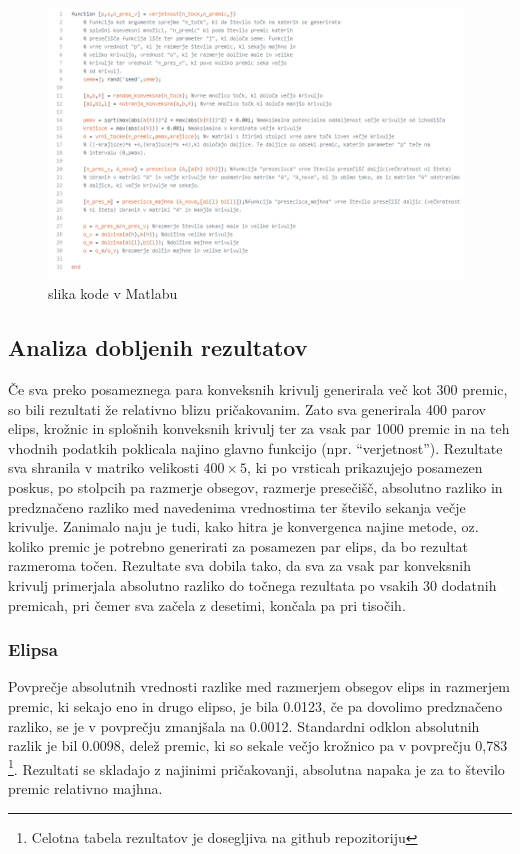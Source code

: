 \documentclass[a4paper]{article}
\begin{document}
\begin{figure}[h]
\centering
\includegraphics[width=110mm]{slika_kode}
\caption{slika kode v Matlabu \label{overflow}}
\end{figure}

\subsection{Analiza dobljenih rezultatov}
Če sva preko posameznega para konveksnih krivulj generirala več kot 300 premic, so bili rezultati že relativno blizu pričakovanim. Zato sva generirala 400 parov elips, krožnic in splošnih konveksnih krivulj ter za vsak par 1000 premic in na teh vhodnih podatkih poklicala najino glavno funkcijo (npr. ``verjetnost''). Rezultate sva shranila v matriko velikosti $400 \times 5$, ki po vrsticah prikazujejo posamezen poskus, po stolpcih pa razmerje obsegov, razmerje presečišč, absolutno razliko in predznačeno razliko med navedenima vrednostima ter število sekanja večje krivulje.
Zanimalo naju je tudi, kako hitra je konvergenca najine metode, oz. koliko premic je potrebno generirati za posamezen par elips, da bo rezultat razmeroma točen. Rezultate sva dobila tako, da sva za vsak par konveksnih krivulj primerjala absolutno razliko do točnega rezultata po vsakih 30 dodatnih premicah, pri čemer sva začela z desetimi, končala pa pri tisočih.


\subsubsection{Elipsa}
Povprečje absolutnih vrednosti razlike med razmerjem obsegov elips in razmerjem premic, ki sekajo eno in drugo elipso, je bila 0.0123, če pa dovolimo predznačeno razliko, se je v povprečju zmanjšala na 0.0012. Standardni odklon absolutnih razlik je bil 0.0098, delež premic, ki so sekale večjo krožnico pa v povprečju 0,783 \footnote[1]{Celotna tabela rezultatov je dosegljiva na github repozitoriju}. Rezultati se skladajo z najinimi pričakovanji, absolutna napaka je za to število premic relativno majhna.
\end{document}
